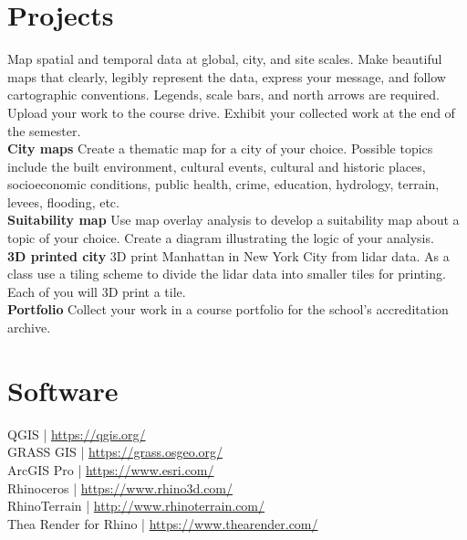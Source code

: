 \documentclass[11pt,article,oneside]{memoir}
\begin{document}

\section{Projects}
Map spatial and temporal data
at global, city, and site scales.
Make beautiful maps that 
clearly, legibly represent the data,
express your message, and
follow cartographic conventions.
Legends, scale bars, and north arrows are required.
Upload your work to the course drive.
Exhibit your collected work at the end of the semester.\\

\noindent \textbf{City maps}
Create a thematic map for a city of your choice. 
Possible topics include the built environment, 
cultural events, cultural and historic places, 
socioeconomic conditions, public health, crime, education, 
hydrology, terrain, levees, flooding, etc.\\

\noindent \textbf{Suitability map}
Use map overlay analysis 
to develop a suitability map
about a topic of your choice.
Create a diagram illustrating 
the logic of your analysis.\\

\noindent \textbf{3D printed city}
3D print Manhattan in New York City from lidar data. 
As a class use a tiling scheme 
to divide the lidar data into smaller tiles for printing.
Each of you will 3D print a tile.\\

\noindent \textbf{Portfolio}
Collect your work in a course portfolio 
for the school's accreditation archive.\\

\clearpage

\section{Software}
\begin{multicols}{2}
\raggedright
QGIS | \url{https://qgis.org/}\\
GRASS GIS | \url{https://grass.osgeo.org/}\\
ArcGIS Pro | \url{https://www.esri.com/}\\
Rhinoceros | \url{https://www.rhino3d.com/}\\
RhinoTerrain | \url{http://www.rhinoterrain.com/}\\
Thea Render for Rhino | \url{https://www.thearender.com/}\\
\end{multicols}
\end{document}
